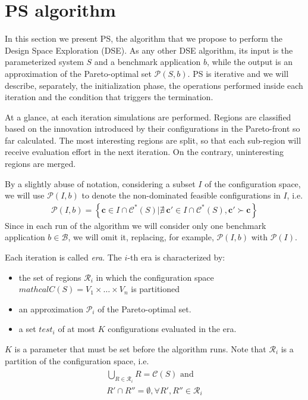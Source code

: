 
\section{PS algorithm}
In this section we present PS, the algorithm that we propose to perform the Design Space Exploration (DSE). As any other DSE algorithm, its input is the parameterized system $S$ and a benchmark application $b$, while the output is an approximation of the Pareto-optimal set $\mathcal{P}\left(S,b\right)$.   
PS is iterative and we will describe, separately, the initialization phase, the operations performed inside each iteration and the condition that triggers the termination.

At a glance, at each iteration simulations are performed. Regions are classified based on the innovation introduced by their configurations in the Pareto-front so far calculated. The most interesting regions are split, so that each sub-region will receive evaluation effort in the next iteration. On the contrary, uninteresting regions are merged.

By a slightly abuse of notation, considering a subset $I$ of the configuration space, we will use  $\mathcal{P}(I,b)$ to denote the non-dominated feasible configurations in $I$, i.e.
	\begin{align}
		\mathcal{P}(I,b)=
		\left\{ \mathbf{c} \in I \cap \mathcal{C}^*(S) | \nexists \ \mathbf{c}' \in I \cap \mathcal{C}^*(S), \mathbf{c}' \succ \mathbf{c} \right\}
	\end{align}
Since in each run of the algorithm we will consider only one benchmark application $b\in\mathcal{B}$, we will omit it, replacing, for example, $\mathcal{P}(I,b)$ with  $\mathcal{P}(I)$.

Each iteration is called \emph{era}. The $i$-th era is characterized by: 
	\begin{itemize}
	\item the set of regions $\mathcal{R}_{i}$ in which the configuration space
	$mathcal{C}(S)=V_{1}\times\dots\times V_{n}$ is partitioned
	\item an approximation $\mathscr{P}_{i}$ of the Pareto-optimal set.
	\item a set $test_{i}$ of at most $K$ configurations evaluated
	in the era.
	\end{itemize}
$K$ is a parameter that must be set before the algorithm runs.
Note that $\mathcal{R}_{i}$ is a partition of the configuration space, i.e.
	\begin{align}\begin{array}{l}
		\bigcup_{R\in\mathcal{R}_i} R = \mathcal{C}(S) \mbox{ and}\\
		R' \cap R'' = \emptyset, \forall R',R'' \in \mathcal{R}_i
	\end{array}\end{align}

